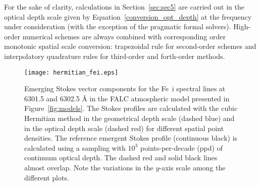 \documentclass[iop,numberedappendix,twocolappendix,twocolumn]{emulateapj}
\begin{document}
For the sake of clarity, calculations in Section~\ref{sec:sec5} are carried out in the optical depth scale given by Equation~\eqref{conversion_opt_depth} at the frequency under consideration (with the exception of the pragmatic formal solvers).
High-order numerical schemes are always combined with corresponding order monotonic spatial scale conversion: trapezoidal rule for second-order schemes and
interpolatory quadrature rules for third-order \citep[based on][]{fritsch1984} and forth-order \citep[based on][]{steffen1990} methods.
%
\begin{figure*}
\centering
\texttt{[image: hermitian\_fei.eps]}  \caption{Emerging Stokes vector components for the Fe~{\sc i} spectral lines at 6301.5 and 6302.5 {\rm \AA} in the FALC atmospheric model presented in Figure~\ref{fig:models}. The Stokes profiles are calculated with the cubic Hermitian method in the geometrical depth scale (dashed blue) and in the optical depth scale (dashed red) for different spatial point densities.
The reference emergent Stokes profile (continuous black) is calculated using a sampling with $10^3$ points-per-decade (ppd) of continuum optical depth.
The dashed red and solid black lines almost overlap. Note the variations in the $y$-axis scale among the different plots.}
\label{fig:conversion}
\end{figure*}
%
%
\end{document}
